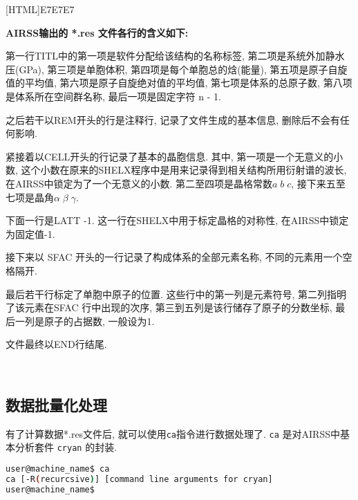 \documentclass[a4paper, 10pt]{article}
\begin{document}
\noindent{}[HTML]{E7E7E7}{\parbox{\textwidth}{%
\noindent \textbf{AIRSS输出的 *.res 文件各行的含义如下:}
\begin{maineu}
\item 第一行TITL中的第一项是软件分配给该结构的名称标签, 第二项是系统外加静水压(GPa), 第三项是单胞体积, 第四项是每个单胞总的焓(能量), 第五项是原子自旋值的平均值, 第六项是原子自旋绝对值的平均值, 第七项是体系的总原子数, 第八项是体系所在空间群名称, 最后一项是固定字符 n - 1.
\item 之后若干以REM开头的行是注释行, 记录了文件生成的基本信息, 删除后不会有任何影响.
\item 紧接着以CELL开头的行记录了基本的晶胞信息. 其中, 第一项是一个无意义的小数, 这个小数在原来的SHELX程序中是用来记录得到相关结构所用衍射谱的波长, 在AIRSS中锁定为了一个无意义的小数. 第二至四项是晶格常数\(a\;b\;c\), 接下来五至七项是晶角\(\alpha\;\beta\;\gamma\).
\item 下面一行是LATT -1. 这一行在SHELX中用于标定晶格的对称性, 在AIRSS中锁定为固定值-1.
\item 接下来以 SFAC 开头的一行记录了构成体系的全部元素名称, 不同的元素用一个空格隔开.
\item 最后若干行标定了单胞中原子的位置. 这些行中的第一列是元素符号, 第二列指明了该元素在SFAC 行中出现的次序, 第三到五列是该行储存了原子的分数坐标, 最后一列是原子的占据数, 一般设为1.
\item 文件最终以END行结尾.
\end{maineu}}}\\

\subsection{数据批量化处理}
有了计算数据*.res文件后, 就可以使用\verb|ca|指令进行数据处理了. \verb|ca| 是对AIRSS中基本分析套件 \verb|cryan| 的封装. 
\begin{lstlisting}[language={bash}]
user@machine_name$ ca
ca [-R(recurcsive)] [command line arguments for cryan]
user@machine_name$
\end{lstlisting}
\end{document}
